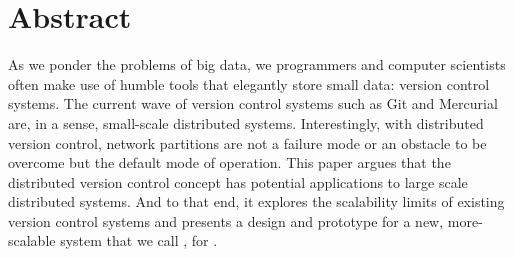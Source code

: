 \chapter{Abstract}

As we ponder the problems of big data, we programmers and computer scientists
often make use of humble tools that elegantly store small data: version control
systems. The current wave of version control systems such as Git and Mercurial
are, in a sense, small-scale distributed systems. Interestingly, with
distributed version control, network partitions are not a failure mode or an
obstacle to be overcome but the default mode of operation. This paper argues
that the distributed version control concept has potential applications to large
scale distributed systems. And to that end, it explores the scalability limits
of existing version control systems and presents a design and prototype for a
new, more-scalable system that we call , for .
